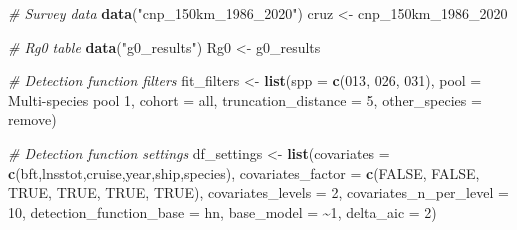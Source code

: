 \documentclass[
]{book}
\newenvironment{Shaded}{\begin{snugshade}}{\end{snugshade}}
\newcommand{\AttributeTok}[1]{\textcolor[rgb]{0.13,0.29,0.53}{#1}}
\newcommand{\CommentTok}[1]{\textcolor[rgb]{0.56,0.35,0.01}{\textit{#1}}}
\newcommand{\ConstantTok}[1]{\textcolor[rgb]{0.56,0.35,0.01}{#1}}
\newcommand{\DecValTok}[1]{\textcolor[rgb]{0.00,0.00,0.81}{#1}}
\newcommand{\FunctionTok}[1]{\textcolor[rgb]{0.13,0.29,0.53}{\textbf{#1}}}
\newcommand{\NormalTok}[1]{#1}
\newcommand{\OtherTok}[1]{\textcolor[rgb]{0.56,0.35,0.01}{#1}}
\newcommand{\StringTok}[1]{\textcolor[rgb]{0.31,0.60,0.02}{#1}}
\begin{document}
\begin{Shaded}
\begin{Highlighting}[]
\CommentTok{\# Survey data}
\FunctionTok{data}\NormalTok{(}\StringTok{"cnp\_150km\_1986\_2020"}\NormalTok{)}
\NormalTok{cruz }\OtherTok{\textless{}{-}}\NormalTok{ cnp\_150km\_1986\_2020}

\CommentTok{\# Rg0 table}
\FunctionTok{data}\NormalTok{(}\StringTok{"g0\_results"}\NormalTok{)}
\NormalTok{Rg0 }\OtherTok{\textless{}{-}}\NormalTok{ g0\_results}

\CommentTok{\# Detection function filters}
\NormalTok{fit\_filters }\OtherTok{\textless{}{-}} \FunctionTok{list}\NormalTok{(}\AttributeTok{spp =} \FunctionTok{c}\NormalTok{(}\StringTok{\textquotesingle{}013\textquotesingle{}}\NormalTok{, }\StringTok{\textquotesingle{}026\textquotesingle{}}\NormalTok{, }\StringTok{\textquotesingle{}031\textquotesingle{}}\NormalTok{), }
                   \AttributeTok{pool =} \StringTok{\textquotesingle{}Multi{-}species pool 1\textquotesingle{}}\NormalTok{,}
                   \AttributeTok{cohort =} \StringTok{\textquotesingle{}all\textquotesingle{}}\NormalTok{,}
                   \AttributeTok{truncation\_distance =} \DecValTok{5}\NormalTok{,}
                   \AttributeTok{other\_species =} \StringTok{\textquotesingle{}remove\textquotesingle{}}\NormalTok{)}

\CommentTok{\# Detection function settings}
\NormalTok{df\_settings }\OtherTok{\textless{}{-}} \FunctionTok{list}\NormalTok{(}\AttributeTok{covariates =} \FunctionTok{c}\NormalTok{(}\StringTok{\textquotesingle{}bft\textquotesingle{}}\NormalTok{,}\StringTok{\textquotesingle{}lnsstot\textquotesingle{}}\NormalTok{,}\StringTok{\textquotesingle{}cruise\textquotesingle{}}\NormalTok{,}\StringTok{\textquotesingle{}year\textquotesingle{}}\NormalTok{,}\StringTok{\textquotesingle{}ship\textquotesingle{}}\NormalTok{,}\StringTok{\textquotesingle{}species\textquotesingle{}}\NormalTok{),}
                   \AttributeTok{covariates\_factor =} \FunctionTok{c}\NormalTok{(}\ConstantTok{FALSE}\NormalTok{, }\ConstantTok{FALSE}\NormalTok{, }\ConstantTok{TRUE}\NormalTok{, }\ConstantTok{TRUE}\NormalTok{, }\ConstantTok{TRUE}\NormalTok{, }\ConstantTok{TRUE}\NormalTok{),}
                   \AttributeTok{covariates\_levels =} \DecValTok{2}\NormalTok{,}
                   \AttributeTok{covariates\_n\_per\_level =} \DecValTok{10}\NormalTok{,}
                   \AttributeTok{detection\_function\_base =} \StringTok{\textquotesingle{}hn\textquotesingle{}}\NormalTok{,}
                   \AttributeTok{base\_model =} \StringTok{\textquotesingle{}\textasciitilde{}1\textquotesingle{}}\NormalTok{,}
                   \AttributeTok{delta\_aic =} \DecValTok{2}\NormalTok{)}


\end{Highlighting}
\end{Shaded}
\end{document}
